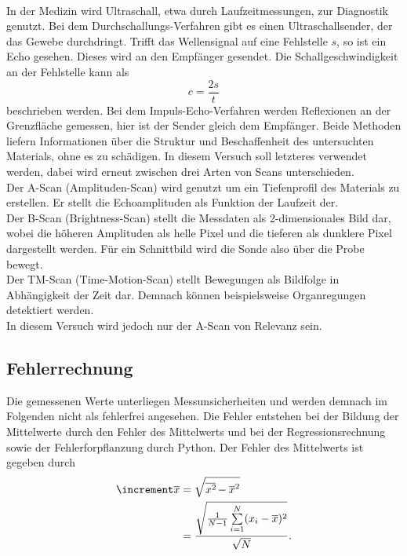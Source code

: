 \\
\noindent In der Medizin wird Ultraschall, etwa durch Laufzeitmessungen, zur Diagnostik
genutzt. Bei dem Durchschallungs-Verfahren gibt es einen Ultraschallsender,
der das Gewebe durchdringt. Trifft das Wellensignal auf eine Fehlstelle $s$, so 
ist ein Echo gesehen. Dieses wird an den Empfänger gesendet. Die Schallgeschwindigkeit 
an der Fehlstelle kann als
\begin{equation}
    \label{eqn:3}
    c = \frac{2s}{t}
\end{equation}
beschrieben werden.
Bei dem Impuls-Echo-Verfahren werden Reflexionen an der Grenzfläche gemessen, hier 
ist der Sender gleich dem Empfänger. Beide Methoden liefern Informationen über
die Struktur und Beschaffenheit des untersuchten Materials, ohne es zu schädigen.
In diesem Versuch soll letzteres verwendet werden, dabei wird erneut zwischen 
drei Arten von Scans unterschieden.
\vspace{0.5em}
\\
\noindent Der A-Scan (Amplituden-Scan) wird genutzt um ein Tiefenprofil des 
Materials zu erstellen. Er stellt die Echoamplituden als Funktion der Laufzeit
der.
\vspace{0.5em}
\\
\noindent Der B-Scan (Brightness-Scan) stellt die Messdaten als 2-dimensionales 
Bild dar, wobei die höheren Amplituden als helle Pixel und die tieferen als 
dunklere Pixel dargestellt werden. Für ein Schnittbild wird die Sonde also 
über die Probe bewegt.
\vspace{0.5em}
\\
\noindent Der TM-Scan (Time-Motion-Scan) stellt Bewegungen als Bildfolge in 
Abhängigkeit der Zeit dar. Demnach können beispielsweise Organregungen 
detektiert werden.
\vspace{0.5em}
\\
In diesem Versuch wird jedoch nur der A-Scan von Relevanz sein.

\subsection{Fehlerrechnung}
Die gemessenen Werte unterliegen Messunsicherheiten und werden demnach im
Folgenden nicht als fehlerfrei angesehen. Die Fehler entstehen bei der
Bildung der Mittelwerte durch den Fehler des Mittelwerts und bei der
Regressionsrechnung sowie der Fehlerforpflanzung durch Python.
Der Fehler des Mittelwerts ist gegeben durch 
\begin{equation}
    \begin{aligned}
        \increment \overline{x} &= \sqrt{\overline{x^2\kern-0.1em} - \overline{x}^2} \\
                            &= \frac{\sqrt{\frac{1}{N-1} \sum\limits_{i=1}^N (x_i - \overline{x})^2}}{\sqrt{N}}.
    \end{aligned}
\end{equation}

